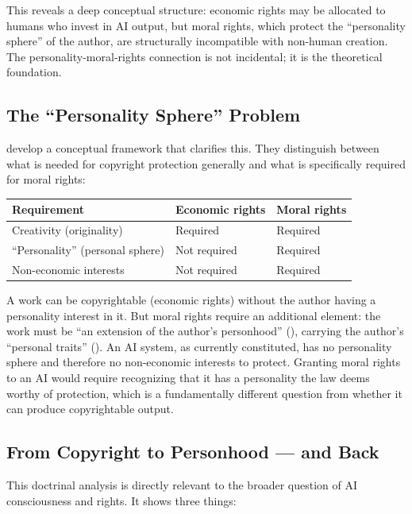 \documentclass[acmlarge, nonacm]{acmart}
\begin{document}
This reveals a deep conceptual structure: economic rights may be allocated to humans who invest in AI output, but moral rights, which protect the ``personality sphere'' of the author, are structurally incompatible with non-human creation. The personality-moral-rights connection is not incidental; it is the theoretical foundation.

\subsection{The ``Personality Sphere'' Problem}

\citet{miernicki2021} develop a conceptual framework that clarifies this. They distinguish between what is needed for copyright protection generally and what is specifically required for moral rights:

\begin{center}
\begin{tabular}{@{}lll@{}}
\toprule
Requirement & Economic rights & Moral rights \\
\midrule
Creativity (originality) & Required & Required \\
``Personality'' (personal sphere) & Not required & Required \\
Non-economic interests & Not required & Required \\
\bottomrule
\end{tabular}
\end{center}

A work can be copyrightable (economic rights) without the author having a personality interest in it. But moral rights require an additional element: the work must be ``an extension of the author's personhood'' (\cite{rigamonti2006}), carrying the author's ``personal traits'' (\cite{rosenthal_kwall2010}). An AI system, as currently constituted, has no personality sphere and therefore no non-economic interests to protect. Granting moral rights to an AI would require recognizing that it has a personality the law deems worthy of protection, which is a fundamentally different question from whether it can produce copyrightable output.

\subsection{From Copyright to Personhood --- and Back}

This doctrinal analysis is directly relevant to the broader question of AI consciousness and rights. It shows three things:
\end{document}
